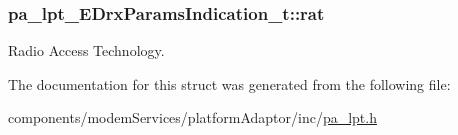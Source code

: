 \subsubsection[{\texorpdfstring{rat}{rat}}]{ pa\+\_\+lpt\+\_\+\+E\+Drx\+Params\+Indication\+\_\+t\+::rat}\hypertarget{structpa__lpt___e_drx_params_indication__t_aad772f6bb0038758f44561c6857ece82}{}\label{structpa__lpt___e_drx_params_indication__t_aad772f6bb0038758f44561c6857ece82}


Radio Access Technology. 



The documentation for this struct was generated from the following file\+:\begin{DoxyCompactItemize}
\item 
components/modem\+Services/platform\+Adaptor/inc/\hyperlink{pa__lpt_8h}{pa\+\_\+lpt.\+h}\end{DoxyCompactItemize}
